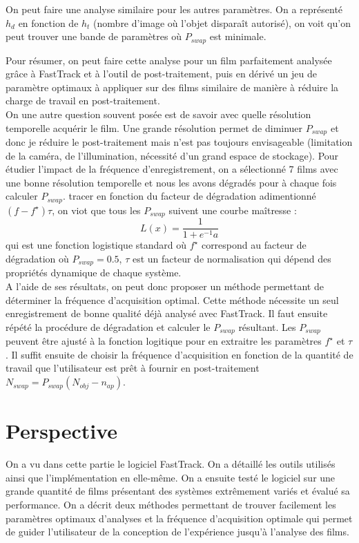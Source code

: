 	On peut faire une analyse similaire pour les autres paramètres. On a représenté $h_d$ en fonction de $h_t$ (nombre d'image où l'objet disparaît autorisé), on voit qu'on peut trouver une bande de paramètres où $P_{swap}$ est minimale.
	
	Pour résumer, on peut faire cette analyse pour un film parfaitement analysée grâce à FastTrack et à l'outil de post-traitement, puis en dérivé un jeu de paramètre optimaux à appliquer sur des films similaire de manière à réduire la charge de travail en post-traitement.\\
	
	On une autre question souvent posée est de savoir avec quelle résolution temporelle acquérir le film. Une grande résolution permet de diminuer $P_{swap}$ et donc je réduire le post-traitement mais n'est pas toujours envisageable (limitation de la caméra, de l'illumination, nécessité d'un grand espace de stockage).
	Pour étudier l'impact de la fréquence d'enregistrement, on a sélectionné 7 films avec une bonne résolution temporelle et nous les avons dégradés pour à chaque fois calculer $P_{swap}$. tracer en fonction du facteur de dégradation adimentionné $(f-f^{\star})\tau$, on viot que tous les $P_{swap}$ suivent une courbe maîtresse :
	$$
	    L(x)=\frac{1}{1+e^{-1}a}
	$$
	qui est une fonction logistique standard où $f^{\star}$ correspond au facteur de dégradation où $P_{swap}=0.5$, $\tau$ est un facteur de normalisation qui dépend des propriétés dynamique de chaque système.\\
	
	A l'aide de ses résultats, on peut donc proposer un méthode permettant de déterminer la fréquence d'acquisition optimal. Cette méthode nécessite un seul enregistrement de bonne qualité déjà analysé avec FastTrack. Il faut ensuite répété la procédure de dégradation et calculer le $P_{swap}$ résultant. Les $P_{swap}$ peuvent être ajusté à la fonction logitique pour en extraitre les paramètres $f^{\star}$ et $\tau$. Il suffit ensuite de choisir la fréquence d'acquisition en fonction de la quantité de travail que l'utilisateur est prêt à fournir en post-traitement $N_{swap}=P_{swap}(N_{obj}-n_{ap})$.
	
\chapter{Perspective}

	On a vu dans cette partie le logiciel FastTrack. On a détaillé les outils utilisés ainsi que l'implémentation en elle-même. On a ensuite testé le logiciel sur une grande quantité de films présentant des systèmes extrêmement variés et évalué sa performance. On a décrit deux méthodes permettant de trouver facilement les paramètres optimaux d'analyses et la fréquence d'acquisition optimale qui permet de guider l'utilisateur de la conception de l'expérience jusqu'à l'analyse des films.\\
	
